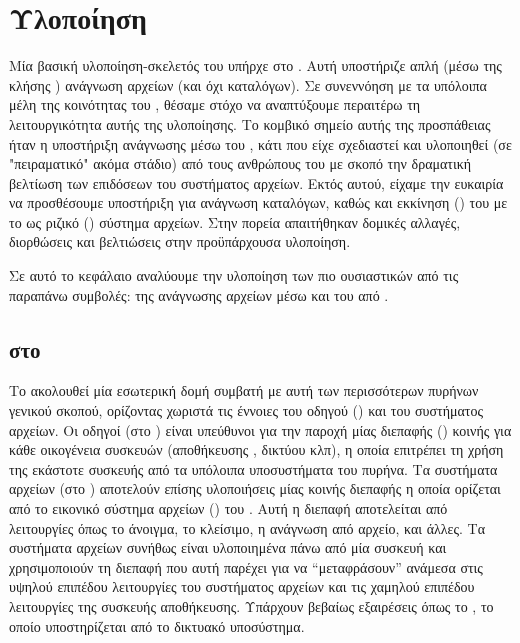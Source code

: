 \chapter{Υλοποίηση}

Μία βασική υλοποίηση-σκελετός του \viofs{} υπήρχε στο \osv{}. %
Αυτή υποστήριζε
απλή (μέσω της κλήσης ) ανάγνωση αρχείων (και όχι καταλόγων).
Σε συνεννόηση με τα υπόλοιπα μέλη της κοινότητας του \osv{}, θέσαμε στόχο να
αναπτύξουμε περαιτέρω τη λειτουργικότητα αυτής της υλοποίησης. Το κομβικό
σημείο αυτής της προσπάθειας ήταν η υποστήριξη ανάγνωσης μέσω του \viofs{}
, κάτι που είχε σχεδιαστεί και υλοποιηθεί (σε "πειραματικό" ακόμα
στάδιο) από τους ανθρώπους του \viofs{} με σκοπό την δραματική βελτίωση των
επιδόσεων του συστήματος αρχείων. Εκτός αυτού, είχαμε την ευκαιρία να
προσθέσουμε υποστήριξη για ανάγνωση καταλόγων, καθώς και εκκίνηση ()
του \osv{} με το \viofs{} ως ριζικό () σύστημα αρχείων. Στην πορεία
απαιτήθηκαν δομικές αλλαγές, διορθώσεις και βελτιώσεις στην προϋπάρχουσα
υλοποίηση.

Σε αυτό το κεφάλαιο αναλύουμε την υλοποίηση των πιο ουσιαστικών από τις παραπάνω
συμβολές: της ανάγνωσης αρχείων μέσω  και του  από
\viofs{}.

\section{ στο \viofs{}}

Το \osv{} ακολουθεί μία εσωτερική δομή συμβατή με αυτή των περισσότερων πυρήνων
γενικού σκοπού, ορίζοντας χωριστά τις έννοιες του οδηγού () και του
συστήματος αρχείων. Οι οδηγοί (στο ) είναι υπεύθυνοι για
την παροχή μίας διεπαφής () κοινής για κάθε οικογένεια συσκευών
(αποθήκευσης , δικτύου κλπ), η οποία επιτρέπει τη χρήση της εκάστοτε
συσκευής από τα υπόλοιπα υποσυστήματα του πυρήνα. Τα συστήματα αρχείων (στο
) αποτελούν επίσης υλοποιήσεις μίας κοινής διεπαφής η οποία ορίζεται από
το εικονικό σύστημα αρχείων () του \osv{}. Αυτή η
διεπαφή αποτελείται από λειτουργίες όπως το άνοιγμα, το κλείσιμο, η ανάγνωση από
αρχείο, και άλλες. Τα συστήματα αρχείων συνήθως είναι υλοποιημένα πάνω από μία
συσκευή  και χρησιμοποιούν τη διεπαφή που αυτή παρέχει για να
``μεταφράσουν'' ανάμεσα στις υψηλού επιπέδου λειτουργίες του συστήματος αρχείων
και τις χαμηλού επιπέδου λειτουργίες της συσκευής αποθήκευσης. Υπάρχουν βεβαίως
εξαιρέσεις όπως το , το οποίο υποστηρίζεται από το δικτυακό υποσύστημα.

